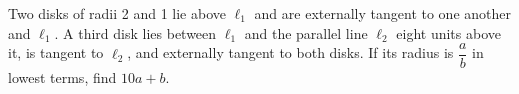 Two disks of radii 2 and 1 lie above $\ell_1$ and are externally tangent to one another and $\ell_1$. A third disk lies between $\ell_1$ and the parallel line $\ell_2$ eight units above it, is tangent to $\ell_2$, and externally tangent to both disks. If its radius is $\dfrac{a}{b}$ in lowest terms, find $10a+b$.
